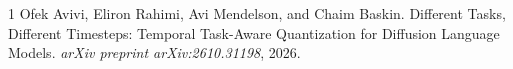 \documentclass[11pt,a4paper]{article}
\begin{document}

\begin{thebibliography}{1}
Ofek Avivi, Eliron Rahimi, Avi Mendelson, and Chaim Baskin.
\newblock Different Tasks, Different Timesteps: Temporal Task-Aware Quantization for Diffusion Language Models.
\newblock \emph{arXiv preprint arXiv:2610.31198}, 2026.
\end{thebibliography}
\end{document}
